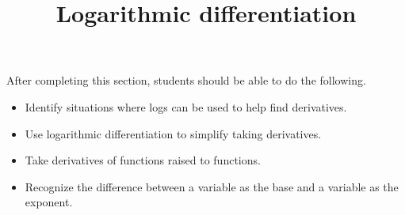\documentclass{ximera}
\title{Logarithmic differentiation}
\begin{document}
\begin{abstract}
  
\end{abstract}

\maketitle

\begin{sectionOutcomes}

After completing this section, students should be able to do the following.

\begin{itemize}
	\item Identify situations where logs can be used to help find derivatives.
	\item Use logarithmic differentiation to simplify taking derivatives.
	\item Take derivatives of functions raised to functions.
	\item Recognize the difference between a variable as the base and a variable as the exponent.
\end{itemize}

\end{sectionOutcomes}
\end{document}
